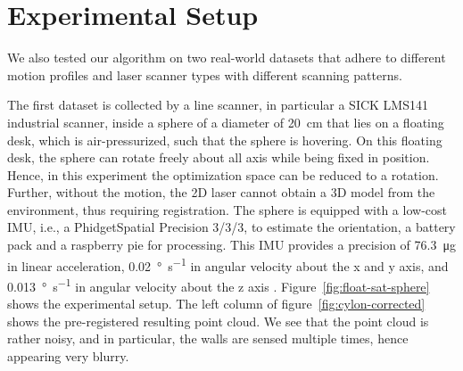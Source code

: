\section{Experimental Setup}\label{sec:experimentalSetup}

We also tested our algorithm on two real-world datasets that adhere to different motion profiles and laser scanner types with different scanning patterns.

The first dataset is collected by a line scanner, in particular a SICK LMS141 industrial scanner, inside a sphere of a diameter of \SI{20}{\centi\meter} that lies on a floating desk, which is air-pressurized, such that the sphere is hovering.
On this floating desk, the sphere can rotate freely about all axis while being fixed in position. 
Hence, in this experiment the optimization space can be reduced to a rotation.
Further, without the motion, the 2D laser cannot obtain a 3D model from the environment, thus requiring registration. 
The sphere is equipped with a low-cost IMU, i.e., a PhidgetSpatial Precision 3/3/3, to estimate the orientation, a battery pack and a raspberry pie for processing.
This IMU provides a precision of \SI{76.3}{\micro g} in linear acceleration, \SI{0.02}{\degree\per\second} in angular velocity about the x and y axis, and \SI{0.013}{\degree\per\second} in angular velocity about the z axis \cite{PhidgetSpatial}.  
Figure~\ref{fig:float-sat-sphere} shows the experimental setup. The left column of figure~\ref{fig:cylon-corrected} shows the pre-registered resulting point cloud. 
We see that the point cloud is rather noisy, and in particular, the walls are sensed multiple times, hence appearing very blurry. 

